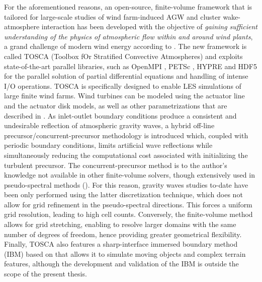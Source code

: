 For the aforementioned reasons, an open-source, finite-volume framework that is tailored for large-scale studies of wind farm-induced AGW and cluster wake-atmosphere interaction has been developed with the objective of \textit{gaining sufficient understanding of the physics of atmospheric flow within and around wind plants}, a grand challenge of modern wind energy according to \cite{ShawEtAl2022}. The new framework is called \acrshort{TOSCA} (Toolbox fOr Stratified Convective Atmospheres) and exploits state-of-the-art parallel libraries, such as OpenMPI \citep{OpenMPI2004}, PETSc \citep{BalayEtAl2022b}, HYPRE \citep{FalgoutYang2002} and HDF5 \citep{HDFGroup20002010} for the parallel solution of partial differential equations and handling of intense \acrshort{I/O} operations. TOSCA is specifically designed to enable LES simulations of large finite wind farms. Wind turbines can be modeled using the actuator line \citep{SorensenShen2002} and the actuator disk \citep{JimenezEtAl2007, JimenezEtAl2008} models, as well as other parametrizations that are described in . As inlet-outlet boundary conditions produce a consistent and undesirable reflection of atmospheric gravity waves, a hybrid off-line precursor/concurrent-precursor methodology is introduced which, coupled with periodic boundary conditions, limits artificial wave reflections while simultaneously reducing the computational cost associated with initializing the turbulent precursor. The concurrent-precursor method \citep{InoueEtAl2014} is to the author's knowledge not available in other finite-volume solvers, though extensively used in pseudo-spectral methods (\citealp{WuPorteAgel2017, AllaertsMayers2017a, AllaertsMayers2017b}). For this reason, gravity waves studies to-date have been only performed using the latter discretization technique, which does not allow for grid refinement in the pseudo-spectral directions. This forces a uniform grid resolution, leading to high cell counts. Conversely, the finite-volume method allows for grid stretching, enabling to resolve larger domains with the same number of degrees of freedom, hence providing greater geometrical flexibility. Finally, TOSCA also features a sharp-interface immersed boundary method (\acrshort{IBM}) based on \cite{MohammadiEtAl2019} that allows it to simulate moving objects and complex terrain features, although the development and validation of the IBM is outside the scope of the present thesis. 

